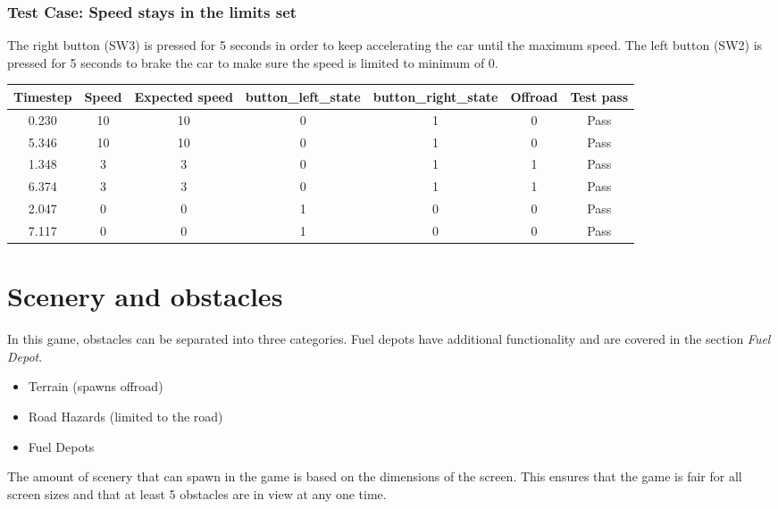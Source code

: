 \documentclass{article}
\begin{document}
\subsubsection*{Test Case: Speed stays in the limits set}
The right button (SW3) is pressed for 5 seconds in order to keep accelerating the car until the maximum speed. The left button (SW2) is pressed for 5 seconds to brake the car to make sure the speed is limited to minimum of 0.
\begin{center}
\begin{tabular}{ c c c c c c c }
Timestep	& Speed	& Expected speed	&  button\_left\_state	& button\_right\_state	& Offroad	& Test pass	\\ \hline
0.230		& 10		& 10			& 0				& 1				& 0		& Pass	\\
5.346		& 10		& 10			& 0				& 1				& 0		& Pass	\\
1.348		& 3		& 3			& 0				& 1				& 1		& Pass	\\
6.374		& 3		& 3			& 0				& 1				& 1		& Pass	\\
2.047 		& 0		& 0			& 1 				& 0 				& 0  		& Pass	\\ 
7.117		& 0		& 0			& 1				& 0				& 0		& Pass	\\ \hline
\end{tabular}
\end{center}

\clearpage

\section{Scenery and obstacles}
In this game, obstacles can be separated into three categories.  Fuel depots have additional functionality and are covered in the section \emph{Fuel Depot}. 
\begin{itemize}
 	\item Terrain (spawns offroad)
 	\item Road Hazards (limited to the road)
	\item Fuel Depots
\end{itemize}
The amount of scenery that can spawn in the game is based on the dimensions of the screen. This ensures that the game is fair for all screen sizes and that at least 5 obstacles are in view at any one time.
\end{document}
